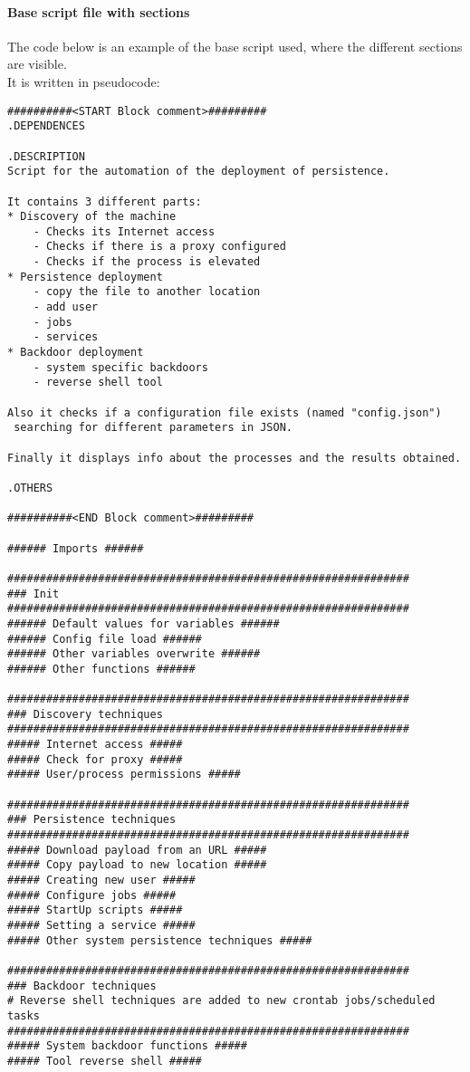 \paragraph{Base script file with sections}
The code below is an example of the base script used, where the different sections are visible.\\ It is written in pseudocode:
\begin{verbatim}
##########<START Block comment>#########
.DEPENDENCES

.DESCRIPTION 
Script for the automation of the deployment of persistence. 

It contains 3 different parts:
* Discovery of the machine
    - Checks its Internet access
    - Checks if there is a proxy configured
    - Checks if the process is elevated
* Persistence deployment
    - copy the file to another location
    - add user
    - jobs
    - services
* Backdoor deployment
    - system specific backdoors
    - reverse shell tool

Also it checks if a configuration file exists (named "config.json") 
 searching for different parameters in JSON.

Finally it displays info about the processes and the results obtained.

.OTHERS

##########<END Block comment>#########

###### Imports ######

##############################################################
### Init
##############################################################
###### Default values for variables ######
###### Config file load ######
###### Other variables overwrite ######
###### Other functions ###### 

##############################################################
### Discovery techniques
##############################################################
##### Internet access #####
##### Check for proxy #####
##### User/process permissions #####

##############################################################
### Persistence techniques
##############################################################
##### Download payload from an URL ##### 
##### Copy payload to new location ##### 
##### Creating new user ##### 
##### Configure jobs ##### 
##### StartUp scripts ##### 
##### Setting a service ##### 
##### Other system persistence techniques ##### 

##############################################################
### Backdoor techniques
# Reverse shell techniques are added to new crontab jobs/scheduled tasks
##############################################################
##### System backdoor functions #####
##### Tool reverse shell #####


\end{verbatim}
